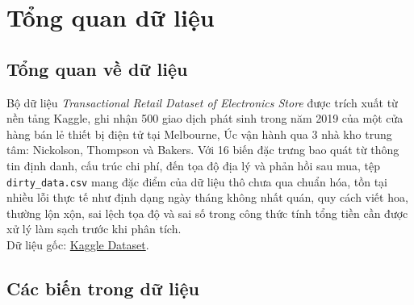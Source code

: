 \section{Tổng quan dữ liệu}
	\subsection{ Tổng quan về dữ liệu}
	Bộ dữ liệu \textit{Transactional Retail Dataset of Electronics Store} được trích xuất từ nền tảng Kaggle, ghi nhận 500 giao dịch phát sinh trong năm 2019 của một cửa hàng bán lẻ thiết bị điện tử tại Melbourne, Úc vận hành qua 3 nhà kho trung tâm: Nickolson, Thompson và Bakers. Với 16 biến đặc trưng bao quát từ thông tin định danh, cấu trúc chi phí, đến tọa độ địa lý và phản hồi sau mua, tệp \texttt{dirty\_data.csv} mang đặc điểm của dữ liệu thô chưa qua chuẩn hóa, tồn tại nhiều lỗi thực tế như định dạng ngày tháng không nhất quán, quy cách viết hoa, thường lộn xộn, sai lệch tọa độ và sai số trong công thức tính tổng tiền cần được xử lý làm sạch trước khi phân tích.\\[0.2 cm]
	Dữ liệu gốc:  \href{https://www.kaggle.com/datasets/muhammadshahrayar/transactional-retail-dataset-of-electronics-store}{Kaggle Dataset}.
	\subsection{Các biến trong dữ liệu}

